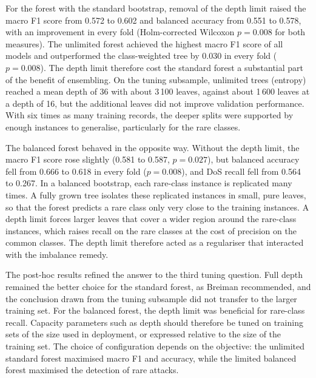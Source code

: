 \documentclass[conference,10pt]{IEEEtran}
\begin{document}
For the forest with the standard bootstrap, removal of the depth limit raised the macro F1 score from 0.572 to 0.602 and balanced accuracy from 0.551 to 0.578, with an improvement in every fold (Holm-corrected Wilcoxon $p=0.008$ for both measures). The unlimited forest achieved the highest macro F1 score of all models and outperformed the class-weighted tree by 0.030 in every fold ($p=0.008$). The depth limit therefore cost the standard forest a substantial part of the benefit of ensembling. On the tuning subsample, unlimited trees (entropy) reached a mean depth of 36 with about 3\,100 leaves, against about 1\,600 leaves at a depth of 16, but the additional leaves did not improve validation performance. With six times as many training records, the deeper splits were supported by enough instances to generalise, particularly for the rare classes.

The balanced forest behaved in the opposite way. Without the depth limit, the macro F1 score rose slightly (0.581 to 0.587, $p=0.027$), but balanced accuracy fell from 0.666 to 0.618 in every fold ($p=0.008$), and DoS recall fell from 0.564 to 0.267. In a balanced bootstrap, each rare-class instance is replicated many times. A fully grown tree isolates these replicated instances in small, pure leaves, so that the forest predicts a rare class only very close to the training instances. A depth limit forces larger leaves that cover a wider region around the rare-class instances, which raises recall on the rare classes at the cost of precision on the common classes. The depth limit therefore acted as a regulariser that interacted with the imbalance remedy.

The post-hoc results refined the answer to the third tuning question. Full depth remained the better choice for the standard forest, as Breiman \cite{breiman2001random} recommended, and the conclusion drawn from the tuning subsample did not transfer to the larger training set. For the balanced forest, the depth limit was beneficial for rare-class recall. Capacity parameters such as depth should therefore be tuned on training sets of the size used in deployment, or expressed relative to the size of the training set. The choice of configuration depends on the objective: the unlimited standard forest maximised macro F1 and accuracy, while the limited balanced forest maximised the detection of rare attacks.
\end{document}
